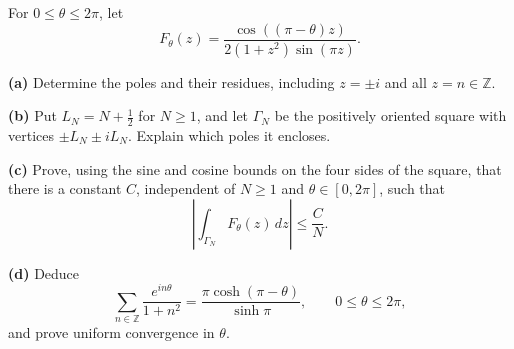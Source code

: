 \begin{problem}[CP-IV-0070]
\label{prob:cp-iv-0070}
For \(0\le\theta\le2\pi\), let
\[
F_\theta(z)=\frac{\cos((\pi-\theta)z)}{2(1+z^2)\sin(\pi z)}.
\]
\par\noindent\textbf{(a)} Determine the poles and their residues, including
\(z=\pm i\) and all \(z=n\in\mathbb Z\).

\par\noindent\textbf{(b)} Put \(L_N=N+\frac12\) for \(N\ge1\), and let
\(\Gamma_N\) be the positively oriented square with vertices
\(\pm L_N\pm iL_N\). Explain which poles it encloses.

\par\noindent\textbf{(c)} Prove, using the sine and cosine bounds on the four
sides of the square, that there is a constant \(C\), independent of
\(N\ge1\) and \(\theta\in[0,2\pi]\), such that
\[
\left|\int_{\Gamma_N}F_\theta(z)\,dz\right|\le\frac{C}{N}.
\]

\par\noindent\textbf{(d)} Deduce
\[
\sum_{n\in\mathbb Z}\frac{e^{in\theta}}{1+n^2}
=\frac{\pi\cosh(\pi-\theta)}{\sinh\pi},
\qquad 0\le\theta\le2\pi,
\]
and prove uniform convergence in \(\theta\).
\end{problem}



